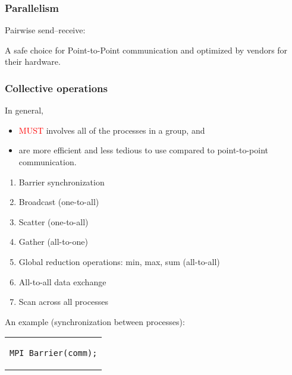\begin{frame}
  \frametitle{Parallelism}

Pairwise send--receive:
\begin{center}

\bigskip
A safe choice for Point-to-Point communication and optimized by vendors for their hardware.
\end{center}

\end{frame}


\begin{frame}[fragile]
  \frametitle{Collective operations}
  In general,
  \begin{itemize}
  \item \textcolor{red}{MUST} involves all of the processes in a group, and
  \item are more efficient and less tedious to use compared to point-to-point
    communication.
  \end{itemize}

\begin{enumerate}
\item Barrier synchronization
\item Broadcast (one-to-all)
\item Scatter (one-to-all)
\item Gather (all-to-one)
\item Global reduction operations: min, max, sum (all-to-all)
\item All-to-all data exchange
\item Scan across all processes
\end{enumerate}

  An example (synchronization between processes):
  \begin{center}
    \begin{tabular}{c}
\begin{lstlisting}[style=c,morekeywords={MPI_Barrier}]
MPI_Barrier(comm);
\end{lstlisting}
    \end{tabular}
  \end{center}
\end{frame}

